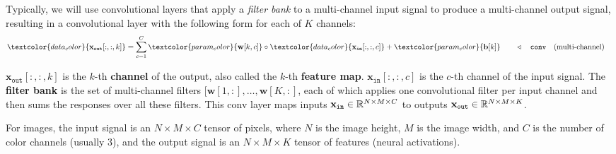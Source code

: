 Typically, we will use convolutional layers that apply a \textit{filter bank} to a multi-channel input signal to produce a multi-channel output signal, resulting in a convolutional layer with the following form for each of $K$ channels:
\begin{align}
\textcolor{data_color}{\mathbf{x}_{\texttt{out}}[:,:,k]} = \sum_{c=1}^C \textcolor{param_color}{\mathbf{w}[k,c]} \circ \textcolor{data_color}{\mathbf{x}_{\texttt{in}}[:,:,c]} + \textcolor{param_color}{\mathbf{b}[k]} & \quad\quad \triangleleft \quad \texttt{conv}\quad \text{(multi-channel)}%
\label{eqn:convolutional_neural_nets:convolutional_layer_multichannel}
\end{align}

$\mathbf{x}_{\texttt{out}}[:,:,k]$ is the $k$-th {\bf channel} of the output, also called the $k$-th {\bf feature map}. $\mathbf{x}_{\texttt{in}}[:,:,c]$ is the $c$-th channel of the input signal. The {\bf filter bank} is the set of multi-channel filters $[\mathbf{w}[1,:], \ldots, \mathbf{w}[K,:]$, each of which applies one convolutional filter per input channel and then sums the responses over all these filters. This conv layer maps inputs $\mathbf{x}_{\texttt{in}} \in \mathbb{R}^{N \times M \times C}$ to outputs $\mathbf{x}_{\texttt{out}} \in \mathbb{R}^{N \times M \times K}$.

For images, the input signal is an $N \times M \times C$ tensor of pixels, where $N$ is the image height, $M$ is the image width, and $C$ is the number of color channels (usually 3), and the output signal is an $N \times M \times K$ tensor of features (neural activations).


